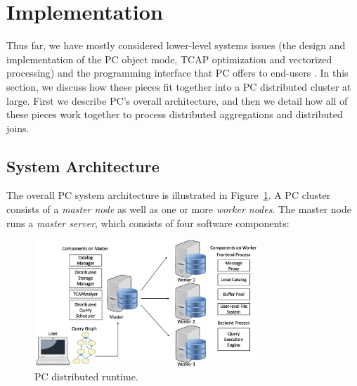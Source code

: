 
\section{Implementation}
\label{sec:implementation}

Thus far, we have mostly considered lower-level systems issues (the design and implementation of the PC object mode, TCAP optimization and vectorized processing) and
the programming interface that PC offers to end-users%
.  In this
section, we discuss how these pieces fit together into a PC
distributed cluster at large.  First we 
describe PC's overall architecture, and then we detail how all of these pieces work together to process distributed aggregations and distributed joins.


\subsection{System Architecture}

The overall PC system architecture is illustrated in Figure~\ref{fig:arch}.
A PC cluster consists of a \emph{master node} as well as one or more \emph{worker nodes}.
The master node runs a \emph{master server}, which consists of
four software components: 

\begin{figure}
\centering
\includegraphics[width=0.75\textwidth]{arch.pdf}
  \caption{\label{fig:arch} PC distributed runtime.}
\end{figure}


